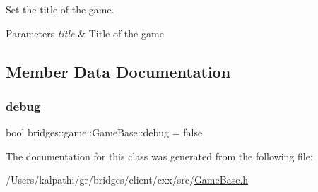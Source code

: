 Set the title of the game. 


\begin{DoxyParams}{Parameters}
{\em title} & Title of the game \\
\hline
\end{DoxyParams}


\subsection{Member Data Documentation}
\mbox{\label{classbridges_1_1game_1_1_game_base_ad2af01edd927a31613d3b881286541bb}} 
\subsubsection{\texorpdfstring{debug}{debug}}
{\footnotesize\ttfamily bool bridges\+::game\+::\+Game\+Base\+::debug = false\hspace{0.3cm}{\ttfamily [protected]}}



The documentation for this class was generated from the following file\+:\begin{DoxyCompactItemize}
\item 
/\+Users/kalpathi/gr/bridges/client/cxx/src/\mbox{\hyperlink{_game_base_8h}{Game\+Base.\+h}}\end{DoxyCompactItemize}
